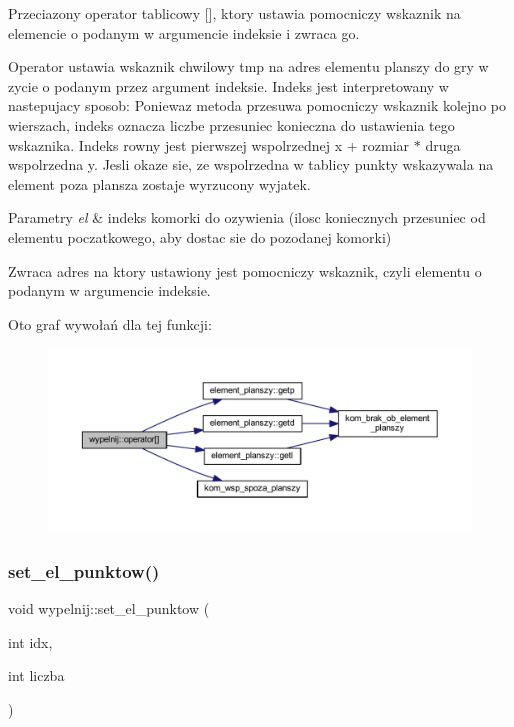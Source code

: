 Przeciazony operator tablicowy \mbox{[}\mbox{]}, ktory ustawia pomocniczy wskaznik na elemencie o podanym w argumencie indeksie i zwraca go.

Operator ustawia wskaznik chwilowy tmp na adres elementu planszy do gry w zycie o podanym przez argument indeksie. Indeks jest interpretowany w nastepujacy sposob\+: Poniewaz metoda przesuwa pomocniczy wskaznik kolejno po wierszach, indeks oznacza liczbe przesuniec konieczna do ustawienia tego wskaznika. Indeks rowny jest pierwszej wspolrzednej x + rozmiar $\ast$ druga wspolrzedna y. Jesli okaze sie, ze wspolrzedna w tablicy punkty wskazywala na element poza plansza zostaje wyrzucony wyjatek. 
\begin{DoxyParams}{Parametry}
{\em el} & indeks komorki do ozywienia (ilosc koniecznych przesuniec od elementu poczatkowego, aby dostac sie do pozodanej komorki) \\
\hline
\end{DoxyParams}
\begin{DoxyReturn}{Zwraca}
adres na ktory ustawiony jest pomocniczy wskaznik, czyli elementu o podanym w argumencie indeksie. 
\end{DoxyReturn}
Oto graf wywołań dla tej funkcji\+:
\nopagebreak
\begin{figure}[H]
\begin{center}
\leavevmode
\includegraphics[width=350pt]{classwypelnij_a591374caf7e1350fcad469f47baa41e2_cgraph}
\end{center}
\end{figure}
\mbox{\label{classwypelnij_a8da39f8d32230b2db5f87d0e4cebc83f}} 
\subsubsection{\texorpdfstring{set\+\_\+el\+\_\+punktow()}{set\_el\_punktow()}}
{\footnotesize\ttfamily void wypelnij\+::set\+\_\+el\+\_\+punktow (\begin{DoxyParamCaption}\item[{int}]{idx,  }\item[{int}]{liczba }\end{DoxyParamCaption})}

